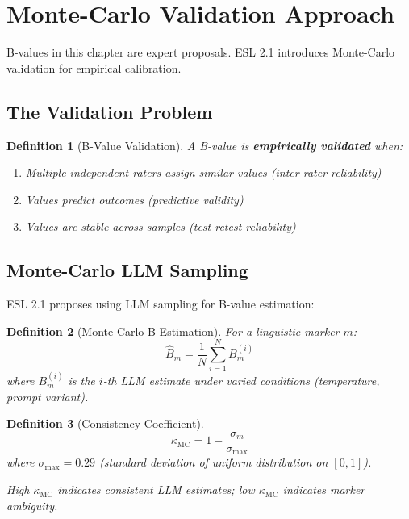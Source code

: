 \documentclass[11pt,a4paper]{article}
\newtheorem{definition}{Definition}[section]
\theoremstyle{remark}
\begin{document}

\section{Monte-Carlo Validation Approach}
\label{sec:validation}

B-values in this chapter are expert proposals. ESL 2.1 introduces Monte-Carlo validation for empirical calibration.

\subsection{The Validation Problem}

\begin{definition}[B-Value Validation]
\label{def:b-validation}
A B-value is \textbf{empirically validated} when:
\begin{enumerate}
    \item Multiple independent raters assign similar values (inter-rater reliability)
    \item Values predict outcomes (predictive validity)
    \item Values are stable across samples (test-retest reliability)
\end{enumerate}
\end{definition}

\subsection{Monte-Carlo LLM Sampling}

ESL 2.1 proposes using LLM sampling for B-value estimation:

\begin{definition}[Monte-Carlo B-Estimation]
\label{def:mc-b}
For a linguistic marker $m$:
\begin{equation}
\hat{B}_m = \frac{1}{N} \sum_{i=1}^{N} B_m^{(i)}
\end{equation}
where $B_m^{(i)}$ is the $i$-th LLM estimate under varied conditions (temperature, prompt variant).
\end{definition}

\begin{definition}[Consistency Coefficient]
\label{def:kappa-mc}
\begin{equation}
\kappa_{\text{MC}} = 1 - \frac{\sigma_m}{\sigma_{\max}}
\end{equation}
where $\sigma_{\max} = 0.29$ (standard deviation of uniform distribution on $[0,1]$).

High $\kappa_{\text{MC}}$ indicates consistent LLM estimates; low $\kappa_{\text{MC}}$ indicates marker ambiguity.
\end{definition}
\end{document}

